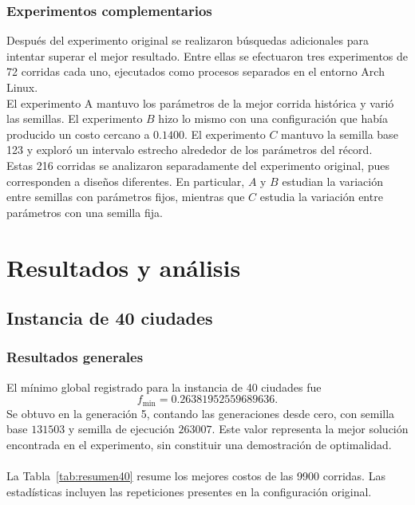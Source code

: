 \documentclass[12pt]{article}
\begin{document}
\subsubsection{Experimentos complementarios}

Después del experimento original se realizaron búsquedas adicionales
para intentar superar el mejor resultado. Entre ellas se efectuaron
tres experimentos de 72 corridas cada uno, ejecutados como procesos
separados en el entorno Arch Linux.
\\
El experimento A mantuvo los parámetros de la mejor corrida histórica
y varió las semillas. El experimento $B$ hizo lo mismo con una
configuración que había producido un costo cercano a $0.1400$.
El experimento $C$ mantuvo la semilla base 123 y exploró un intervalo
estrecho alrededor de los parámetros del récord.
\\
Estas 216 corridas se analizaron separadamente del experimento
original, pues corresponden a diseños diferentes. En particular,
$A$ y $B$ estudian la variación entre semillas con parámetros fijos,
mientras que $C$ estudia la variación entre parámetros con una
semilla fija.

\section{Resultados y análisis}
\label{sec:resultados}

\subsection{Instancia de 40 ciudades}

\subsubsection{Resultados generales}

El mínimo global registrado para la instancia de 40 ciudades fue
\[
\boxed{f_{\min}=0.26381952559689636}.
\]
Se obtuvo en la generación 5, contando las generaciones desde cero,
con semilla base $131503$ y semilla de ejecución $263007$.
Este valor representa la mejor solución encontrada en el experimento,
sin constituir una demostración de optimalidad.
\\\\
La Tabla~\ref{tab:resumen40} resume los mejores costos de las 9900
corridas. Las estadísticas incluyen las repeticiones presentes en
la configuración original.
\end{document}
